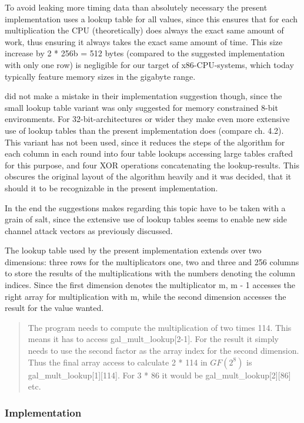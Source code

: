 To avoid leaking more timing data than
absolutely necessary the present implementation uses a lookup table for
all values, since this ensures that for each multiplication the CPU
(theoretically) does always the exact same amount of work, thus ensuring
it always takes the exact same amount of time. This size increase by 2 *
256b = 512 bytes (compared to the suggested implementation with only one
row) is negligible for our target of x86-CPU-systems, which today
typically feature memory sizes in the gigabyte range. 

\cite{rijndael} did not
make a mistake in their implementation suggestion though, since the
small lookup table variant was only suggested for memory constrained
8-bit environments. For 32-bit-architectures or wider they make even more
extensive use of lookup tables than the present implementation does
(compare ch. 4.2). This variant has not been used, since it reduces the
steps of the algorithm for each column in each round into four table
lookups accessing large tables crafted for this purpose, and four XOR
operations concatenating the lookup-results. This obscures the original
layout of the algorithm heavily and it was decided, that it should it to be recognizable
in the present implementation.

In the end the suggestions \cite{rijndael} makes regarding this topic have to
be taken with a grain of salt, since the extensive use of lookup tables
seems to enable new side channel attack vectors as previously discussed.

The lookup table used by the present implementation extends over two
dimensions: three rows for the multiplicators one, two and three and 256
columns to store the results of the multiplications with the numbers
denoting the column indices. Since the first dimension denotes the
multiplicator m, m - 1 accesses the right array for multiplication with
m, while the second dimension accesses the result for the value wanted.

\begin{quote}
The program needs to compute the multiplication of two times 114. This
means it has to access gal\_mult\_lookup[2-1]. For the result it
simply needs to use the second factor as the array index for the second
dimension. Thus the final array access to calculate 2 * 114 in $GF(2^{8})$ is
gal\_mult\_lookup[1][114]. For 3 * 86 it would be
gal\_mult\_lookup[2][86] etc.
\end{quote}

\hypertarget{implementation}{%
\subsubsection{Implementation}\label{implementation}}

